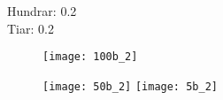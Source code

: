



\pagestyle{empty}

Hundrar: 0.2 \\
Tiar: 0.2

\begin{figure}
	\centering
	\texttt{[image: 100b\_2]}
\end{figure} 

\begin{figure}
	\centering
	\texttt{[image: 50b\_2]}
	\texttt{[image: 5b\_2]}
\end{figure}  
